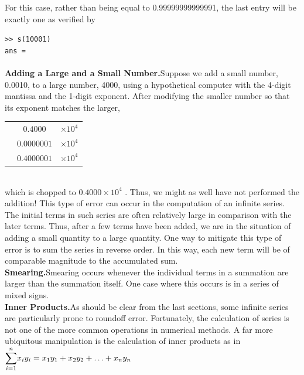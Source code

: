 \documentclass[../main.tex]{subfiles}
\begin{document}
\noindent
For this case, rather than being equal to 0.99999999999991, the last entry will be exactly
one as verified by

\texttt{>> s(10001)\\
\indent ans =\\
\indent{}}\\

\noindent
\textbf{Adding a Large and a Small Number.}\quad Suppose we add a small number, 0.0010, to a
large number, 4000, using a hypothetical computer with the 4-digit mantissa and the 1-digit
exponent. After modifying the smaller number so that its exponent matches the larger,\\

\begin{tabular}{c c c}
    & $0.4000$\hspace{5.5mm} & $ \times 10^4$\\
    & $0.0000001$ & $ \times 10^4$\\
    \hline
    & $0.4000001$ & $ \times 10^4$\\
\end{tabular}\\

\noindent
which is chopped to $0.4000 \times 10^4$ . Thus, we might as well have not performed the addition!
This type of error can occur in the computation of an infinite series. The initial terms
in such series are often relatively large in comparison with the later terms. Thus, after a few
terms have been added, we are in the situation of adding a small quantity to a large quantity.
One way to mitigate this type of error is to sum the series in reverse order. In this way,
each new term will be of comparable magnitude to the accumulated sum.\\

\noindent
\textbf{Smearing.}\quad Smearing occurs whenever the individual terms in a summation are larger
than the summation itself. One case where this occurs is in a series of mixed signs.\\

\noindent
\textbf{Inner Products.}\quad As should be clear from the last sections, some infinite series are particularly
prone to roundoff error. Fortunately, the calculation of series is not one of the more
common operations in numerical methods. A far more ubiquitous manipulation is the calculation
of inner products as in\\

$\mathlarger{\sum}_{i=1}^{n}x_i y_i = x_1 y_1 + x_2 y_2 + \hdots + x_n y_n$\\
\end{document}
